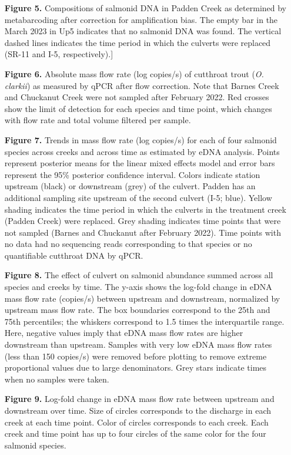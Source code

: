 \documentclass[
]{article}
\begin{document}
\begin{itemize}
\item[\textbf{Figure 5.}] Compositions of salmonid DNA in Padden Creek as determined by metabarcoding after correction for amplification bias. The empty bar in the March 2023 in Up5 indicates that no salmonid DNA was found. The vertical dashed lines indicates the time period in which the culverts were replaced (SR-11 and I-5, respectively).]
\item[\textbf{Figure 6.}] Absolute mass flow rate (log copies/s) of cutthroat trout (\emph{O. clarkii}) as measured by qPCR after flow correction. Note that Barnes Creek and Chuckanut Creek were not sampled after February 2022. Red crosses show the limit of detection for each species and time point, which changes with flow rate and total volume filtered per sample.
\item[\textbf{Figure 7.}] Trends in mass flow rate (log copies/s) for each of four salmonid species across creeks and across time as estimated by eDNA analysis. Points represent posterior means for the linear mixed effects model and error bars represent the 95\% posterior confidence interval. Colors indicate station upstream (black) or downstream (grey) of the culvert. Padden has an additional sampling site upstream of the second culvert (I-5; blue). Yellow shading indicates the time period in which the culverts in the treatment creek (Padden Creek) were replaced. Grey shading indicates time points that were not sampled (Barnes and Chuckanut after February 2022). Time points with no data had no sequencing reads corresponding to that species or no quantifiable cutthroat DNA by qPCR.
\item[\textbf{Figure 8.}] The effect of culvert on salmonid abundance summed across all species and creeks by time. The y-axis shows the log-fold change in eDNA mass flow rate (copies/s) between upstream and downstream, normalized by upstream mass flow rate. The box boundaries correspond to the 25th and 75th percentiles; the whiskers correspond to 1.5 times the interquartile range. Here, negative values imply that eDNA mass flow rates are higher downstream than upstream. Samples with very low eDNA mass flow rates (less than 150 copies/s) were removed before plotting to remove extreme proportional values due to large denominators. Grey stars indicate times when no samples were taken.
\item[\textbf{Figure 9.}] Log-fold change in eDNA mass flow rate between upstream and downstream over time. Size of circles corresponds to the discharge in each creek at each time point. Color of circles corresponds to each creek. Each creek and time point has up to four circles of the same color for the four salmonid species.

\end{itemize}
\end{document}
